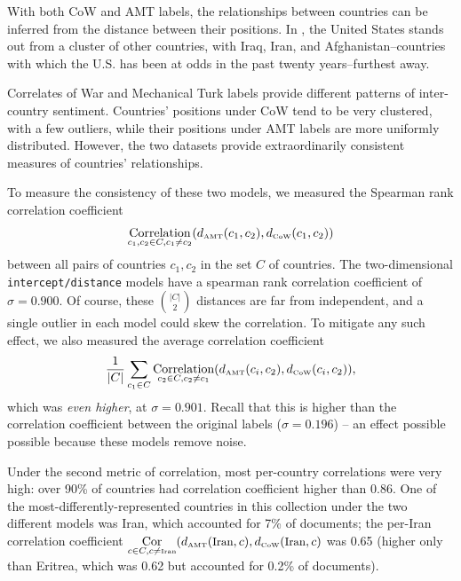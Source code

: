 With both CoW and AMT labels, the relationships between
countries can be inferred from the distance between their positions.
In , the United States stands
out from a cluster of other countries, with Iraq, Iran, and
Afghanistan--countries with which the U.S. has been at odds in the past
twenty years--furthest away.

Correlates of War and Mechanical Turk labels provide different
patterns of inter-country sentiment.  Countries' positions under CoW
tend to be very clustered, with a few outliers, while their positions under
AMT labels are more uniformly distributed.  However, the two datasets
provide extraordinarily consistent measures of countries' relationships.

To measure the consistency of these two models, we measured the
Spearman rank correlation coefficient 
\begin{align*}
\underset{c_1, c_2 \in C, c_1   \neq c_2}
{\operatorname{\mbox{Correlation}}}(d_{\mbox{\tiny AMT}}(c_1, c_2), d_{\mbox{\tiny CoW}}(c_1, c_2))
\end{align*}
between all pairs of countries $c_1, c_2$ in the set $C$ of
countries. The two-dimensional \verb!intercept/distance! models have
a spearman rank correlation coefficient of $\sigma=0.900$.  Of course,
these $|C| \choose{2}$ distances are far from independent, and a
single outlier in each model could skew the correlation.  To mitigate
any such effect, we also measured the average correlation coefficient
\begin{align*}
  \frac{1}{|C|} \sum_{c_1 \in C}
  \underset{c_2 \in C, c_2 \neq c_1}
  {\operatorname{\mbox{Correlation}}}(d_{\mbox{\tiny AMT}}(c_i, c_2), d_{\mbox{\tiny
        CoW}}(c_i, c_2) ),
\end{align*}
which was \emph{even higher}, at $\sigma=0.901$. Recall that this is
higher than the correlation coefficient between the original labels
($\sigma=0.196$) -- an effect possible possible because these models
remove noise.

Under the second metric of correlation, most per-country correlations
were very high: over 90\% of countries had correlation coefficient
higher than 0.86.  One of the most-differently-represented countries
in this collection under the two different models was Iran, which
accounted for 7\% of documents; the per-Iran correlation coefficient
$\underset{c \in C, c \neq \mbox{\tiny Iran}}{\operatorname{\mbox{Cor}}}(d_{\mbox{\tiny AMT}}(\mbox{\small Iran}, c),
d_{\mbox{\tiny CoW}}(\mbox{\small Iran}, c)$ was 0.65 (higher only
than Eritrea, which was 0.62 but accounted for 0.2\% of documents).

